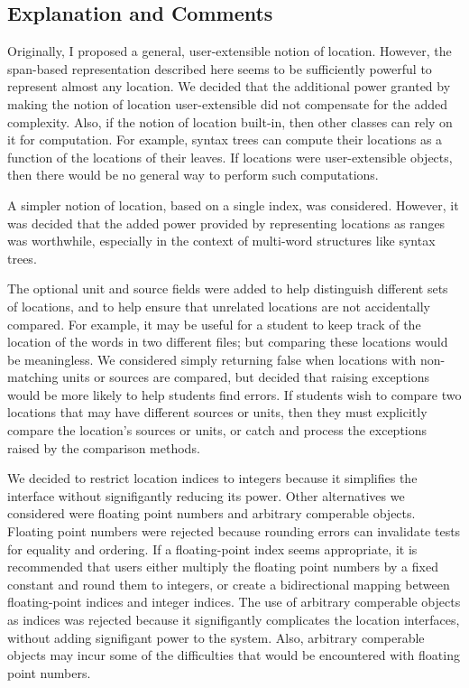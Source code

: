 \documentclass{article}
\begin{document}
  \subsection{Explanation and Comments}

  Originally, I proposed a general, user-extensible notion of
  location.  However, the span-based representation described here
  seems to be sufficiently powerful to represent almost any location.
  We decided that the additional power granted by making the notion of
  location user-extensible did not compensate for the added
  complexity.  Also, if the notion of location built-in, then other
  classes can rely on it for computation.  For example, syntax trees
  can compute their locations as a function of the locations of their
  leaves.  If locations were user-extensible objects, then there would
  be no general way to perform such computations.

  A simpler notion of location, based on a single index, was
  considered.  However, it was decided that the added power provided
  by representing locations as ranges was worthwhile, especially in
  the context of multi-word structures like syntax trees.

  The optional unit and source fields were added to help distinguish
  different sets of locations, and to help ensure that unrelated
  locations are not accidentally compared.  For example, it may be
  useful for a student to keep track of the location of the words in
  two different files; but comparing these locations would be
  meaningless.  We considered simply returning false when locations
  with non-matching units or sources are compared, but decided that
  raising exceptions would be more likely to help students find
  errors.  If students wish to compare two locations that may have
  different sources or units, then they must explicitly compare the
  location's sources or units, or catch and process the exceptions
  raised by the comparison methods.

  We decided to restrict location indices to integers because it
  simplifies the interface without signifigantly reducing its power.
  Other alternatives we considered were floating point numbers and
  arbitrary comperable objects.  Floating point numbers were rejected
  because rounding errors can invalidate tests for equality and
  ordering.  If a floating-point index seems appropriate, it is
  recommended that users either multiply the floating point numbers by
  a fixed constant and round them to integers, or create a
  bidirectional mapping between floating-point indices and integer
  indices.  The use of arbitrary comperable objects as indices was
  rejected because it signifigantly complicates the location
  interfaces, without adding signifigant power to the system.  Also,
  arbitrary comperable objects may incur some of the difficulties that
  would be encountered with floating point numbers.
\end{document}
